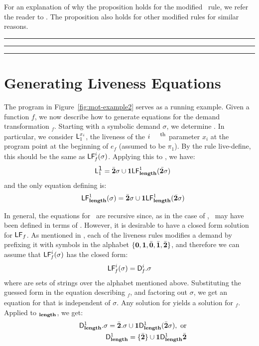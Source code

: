 \documentclass[9pt]{sigplanconf}
\begin{document}
For  an explanation  of why  the  proposition holds  for the  modified
\CONS\  rule,   we  refer   the  reader  to   \cite{asati14lgc}.   The
proposition also holds for other modified rules for similar reasons.

{\color{red} \medskip \hrule \hrule \hrule  \medskip }

\newcommand{\emm}[2]{\ensuremath{\mathcal{#1}_{#2}}}

\section{Generating Liveness Equations}
The  program  in  Figure~\ref{fig:mot-example2}  serves as  a  running
example.   Given a  function $\mathit{f}$,  we now  describe  how to
generate    equations    for     the    demand    transformation
\Lfonly$_\mathit{f}$.   Starting with a  symbolic demand  $\sigma$, we
determine  .  In  particular, we
consider $\mathsf{L}_{{1}}^{x_i}$,  the  liveness of    the
$i^{\mbox{\footnotesize  th}}$
parameter $x_i$ at the  program point at the  beginning of
$e_{\mathit{f}}$ (assumed  to be  $\pi_1$). By the rule {\sc
  live-define}, this should be the
same as $\mathsf{LF}_{\mathit f}^{i}( {\mathit \sigma})$. Applying this to  \length, we have:
\begin{eqnarray*}
&& \mathsf{L}_{{1}}^{\mbox{\tt l}} = \bar{\mathbf{2}}\sigma \cup \mathbf{1}\mathsf{LF}_{\mathit {\mathbf{length}}}^{1}( {\mathit {\bar{\mathbf{2}}}\sigma})
\end{eqnarray*}
and  the only equation defining \Lfone{\length} is:
  \begin{eqnarray*}
   && \mathsf{LF}_{\mathit {\mathbf{length}}}^{1}( {\mathit \sigma})
    =  \bar{\mathbf{2}}\sigma \cup \mathbf{1}\mathsf{LF}_{\mathit {\mathbf{length}}}^{1}( {\mathit {\bar{\mathbf{2}}}\sigma})
   \end{eqnarray*}

In general, the equations for  \Lfonly\ are recursive since, as in the
case  of  \length,  \  may   have  been  defined  in  terms  of
.  However,  it is desirable  to have a  closed form
solution for $\mathsf{LF}_{\mathit \mathit{f}}$.  As mentioned in \cite{asati14lgc},
each  of the liveness  rules modifies  a demand  by prefixing  it with
symbols  in the  alphabet  $\lbrace \mathbf{0},  \mathbf{1},\bar{\mathbf{0}}, \bar{\mathbf{1}},  \bar{\mathbf{2}}
\rbrace$, and therefore we can assume that $\mathsf{LF}_{\mathit f}^{i}( {\mathit \sigma})$ has the
closed form:
\begin{eqnarray}
\label{eq:LF:DI}
  \mathsf{LF}_{\mathit f}^{i}( {\mathit \sigma}) = \mathsf{D}_{\mathit f}^{i}.\sigma
\end{eqnarray}
where  are sets of  strings over the alphabet mentioned above.
  Substituting the guessed form in
the  equation  describing  \Lfonly$_{\mathit  f}$, and  factoring  out
$\sigma$,  we get  an equation  for   that is  independent of
$\sigma$.   Any   solution  for     yields  a   solution  for
\Lfonly$_{\mathit  f}$.  Applied  to  \Lfonly$_{\mathit {\mathbf{length}}}$,  we
get:
  \begin{eqnarray*}
  &&  \mathsf{D}_{\mathit {\mathbf{length}}}^{1}.\sigma = \bar{\mathbf{2}}.\sigma
    \cup \mathbf{1}\mathsf{D}_{\mathit {\mathbf{length}}}^{1}(\bar{\mathbf{2}}\sigma), ~\mbox{or}\\
  &&  \mathsf{D}_{\mathit {\mathbf{length}}}^{1} = \lbrace\bar{\mathbf{2}}\rbrace
    \cup \mathbf{1}\mathsf{D}_{\mathit {\mathbf{length}}}^{1}\bar{\mathbf{2}}
  \end{eqnarray*}
\end{document}
